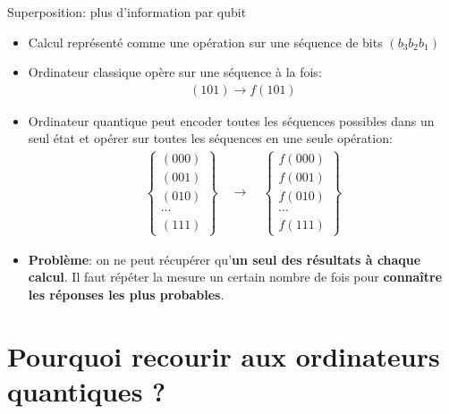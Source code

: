 \documentclass[aspectratio=169,12pt]{beamer}
\begin{document}
\begin{frame}{Superposition: plus d'information par qubit}
    \begin{itemize}[<+->]
        \item Calcul représenté comme une opération sur une séquence de bits $(b_3 b_2 b_1)$
        \item Ordinateur classique opère sur une séquence à la fois: %
        \begin{align*}
            (101) \longrightarrow f(101)
        \end{align*}
        \item Ordinateur quantique peut encoder toutes les séquences possibles dans un seul état et opérer sur toutes les séquences en une seule opération:
        \begin{align*}
            \begin{Bmatrix}
                (000) \\ (001) \\ (010) \\ \cdots \\ (111)
            \end{Bmatrix}
            \quad \longrightarrow \quad
            \begin{Bmatrix}
                f(000) \\ f(001) \\ f(010) \\ \cdots \\ f(111)
            \end{Bmatrix}
        \end{align*}
        \item \textbf{Problème}: on ne peut récupérer qu'\textbf{un seul des résultats à chaque calcul}. Il faut répéter la mesure un certain nombre de fois pour \textbf{connaître les réponses les plus probables}.
    \end{itemize}
\end{frame}

\section{Pourquoi recourir aux ordinateurs quantiques ?}
\end{document}
